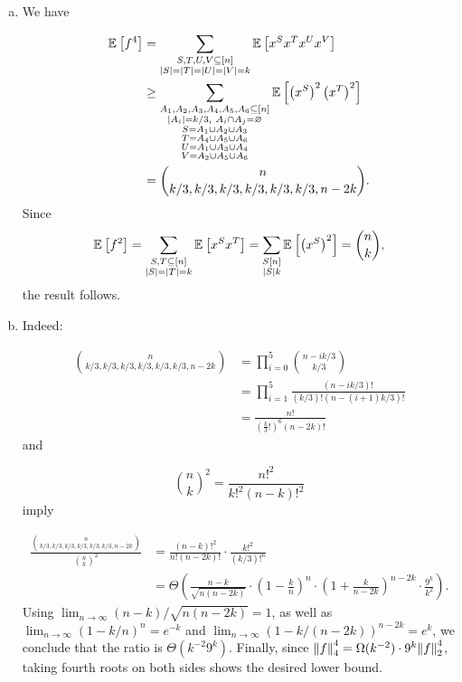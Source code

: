 \documentclass[12pt]{article}
\newcommand{\E}[2][]{\mathbb E_{#1}\left[#2\right]}
\newcommand{\eqn}[1]{\begin{equation*}#1\end{equation*}}
\DeclareMathOperator{\T}{T}
\begin{document}
\begin{enumerate}[(a)]
    \item We have

    \begin{align*}
        \E{f^4} &= \sum_{\substack{S,T,U,V \subseteq [n]\\\abs{S} = \abs{T} = \abs{U} = \abs{V} = k}} \E{x^S x^T x^U x^V}\\
        &\geq \sum_{\substack{A_1, A_2, A_3, A_4, A_5, A_6 \subseteq [n]\\\abs{A_i} = k/3,~ A_i \cap A_j = \varnothing\\S = A_1 \cup A_2 \cup A_3\\T = A_4 \cup A_5 \cup A_6\\U = A_1 \cup A_3 \cup A_4\\V = A_2 \cup A_5 \cup A_6}} \E{\left(x^S\right)^2 \left(x^T\right)^2}\\
        &= \binom{n}{k/3, k/3, k/3, k/3, k/3, k/3, n - 2k}.
    \end{align*}
    Since
    \eqn{\E{f^2} = \sum_{\substack{S, T \subseteq [n]\\\abs{S} = \abs{T} = k}} \E{x^S x^T} = \sum_{\substack{S [n]\\\abs{S} k}} \E{\left(x^S\right)^2} = \binom{n}{k},}
    the result follows.

    \item Indeed:
    
    \begin{align*}
        \binom{n}{k/3, k/3, k/3, k/3, k/3, k/3, n - 2k} &= \prod_{i = 0}^5 \binom{n - ik/3}{k/3}\\
        &= \prod_{i = 1}^5 \frac{(n - ik/3)!}{(k/3)! (n-(i+1)k/3)!}\\
        &= \frac{n!}{\left(\frac{k}{3}!\right)^6 (n - 2k)!}
    \end{align*}
    and
    
    \eqn{\binom{n}{k}^2 = \frac{n!^2}{k!^2 (n-k)!^2}}
    imply
    
    \begin{align*}
        \frac{\binom{n}{k/3, k/3, k/3, k/3, k/3, k/3, n - 2k}}{\binom{n}{k}^2} &= \frac{(n-k)!^2}{n! (n-2k)!} \cdot \frac{k!^2}{(k/3)!^6}\\
        &= \Theta\left(\frac{n-k}{\sqrt{n(n-2k)}} \cdot \left(1 - \frac{k}{n}\right)^n \cdot \left(1 + \frac{k}{n-2k}\right)^{n-2k} \cdot \frac{9^k}{k^2}\right).
    \end{align*}
    Using $\lim_{n \to \infty} (n-k)/\sqrt{n(n-2k)} = 1$, as well as $\lim_{n \to \infty}(1-k/n)^n = e^{-k}$ and $\lim_{n \to \infty}(1-k/(n-2k))^{n-2k} = e^k$, we conclude that the ratio is $\Theta(k^{-2} 9^k)$. Finally, since $\norm{f}_4^4 = \Omega(k^{-2}) \cdot 9^k \norm{f}_2^4$, taking fourth roots on both sides shows the desired lower bound.
\end{enumerate}
    
\end{document}
